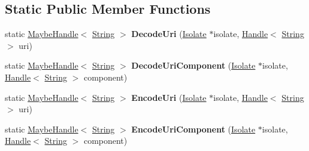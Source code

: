 \subsection*{Static Public Member Functions}
\begin{DoxyCompactItemize}
\item 
\mbox{\label{classv8_1_1internal_1_1Uri_aa94d0981d949bf805cadda0b01e2a04c}} 
static \mbox{\hyperlink{classv8_1_1internal_1_1MaybeHandle}{Maybe\+Handle}}$<$ \mbox{\hyperlink{classv8_1_1internal_1_1String}{String}} $>$ {\bfseries Decode\+Uri} (\mbox{\hyperlink{classv8_1_1internal_1_1Isolate}{Isolate}} $\ast$isolate, \mbox{\hyperlink{classv8_1_1internal_1_1Handle}{Handle}}$<$ \mbox{\hyperlink{classv8_1_1internal_1_1String}{String}} $>$ uri)
\item 
\mbox{\label{classv8_1_1internal_1_1Uri_a075be1f6ced27f970fae46ae56c3de1b}} 
static \mbox{\hyperlink{classv8_1_1internal_1_1MaybeHandle}{Maybe\+Handle}}$<$ \mbox{\hyperlink{classv8_1_1internal_1_1String}{String}} $>$ {\bfseries Decode\+Uri\+Component} (\mbox{\hyperlink{classv8_1_1internal_1_1Isolate}{Isolate}} $\ast$isolate, \mbox{\hyperlink{classv8_1_1internal_1_1Handle}{Handle}}$<$ \mbox{\hyperlink{classv8_1_1internal_1_1String}{String}} $>$ component)
\item 
\mbox{\label{classv8_1_1internal_1_1Uri_ad83dc65b797f1c202b0be64f5fc3a607}} 
static \mbox{\hyperlink{classv8_1_1internal_1_1MaybeHandle}{Maybe\+Handle}}$<$ \mbox{\hyperlink{classv8_1_1internal_1_1String}{String}} $>$ {\bfseries Encode\+Uri} (\mbox{\hyperlink{classv8_1_1internal_1_1Isolate}{Isolate}} $\ast$isolate, \mbox{\hyperlink{classv8_1_1internal_1_1Handle}{Handle}}$<$ \mbox{\hyperlink{classv8_1_1internal_1_1String}{String}} $>$ uri)
\item 
\mbox{\label{classv8_1_1internal_1_1Uri_a4a3353e7462b119f589d21a4b03632f3}} 
static \mbox{\hyperlink{classv8_1_1internal_1_1MaybeHandle}{Maybe\+Handle}}$<$ \mbox{\hyperlink{classv8_1_1internal_1_1String}{String}} $>$ {\bfseries Encode\+Uri\+Component} (\mbox{\hyperlink{classv8_1_1internal_1_1Isolate}{Isolate}} $\ast$isolate, \mbox{\hyperlink{classv8_1_1internal_1_1Handle}{Handle}}$<$ \mbox{\hyperlink{classv8_1_1internal_1_1String}{String}} $>$ component)
\item 

\end{DoxyCompactItemize}
